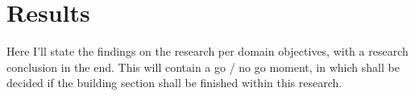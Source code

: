 \documentclass[12pt]{Thesis}
\begin{document}




\tableofcontents










    
    
\chapter{Results}
Here I'll state the findings on the research per domain objectives, with a research conclusion in the end.
	This will contain a go / no go moment, in which shall be decided if the building section shall be finished within this research.
	
\end{document}
